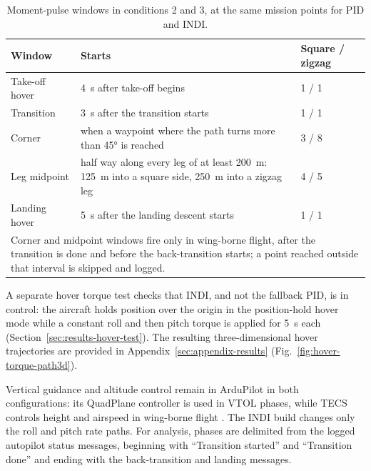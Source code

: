 \documentclass{article}
\begin{document}
\begin{table}[H]
\centering
\caption{Moment-pulse windows in conditions 2 and 3, at the same mission points for PID and INDI.}
\label{tab:disturbance-points}
\begin{tabular}{p{}p{}p{}}
\hline
Window & Starts & Square / zigzag \\
\hline
Take-off hover & \SI{4}{\second} after take-off begins & 1 / 1 \\
\hline
Transition & \SI{3}{\second} after the transition starts & 1 / 1 \\
\hline
Corner & when a waypoint where the path turns more than \ang{45} is reached & 3 / 8 \\
\hline
Leg midpoint & half way along every leg of at least \SI{200}{\meter}: \SI{125}{\meter} into a square side, \SI{250}{\meter} into a zigzag leg & 4 / 5 \\
\hline
Landing hover & \SI{5}{\second} after the landing descent starts & 1 / 1 \\
\hline
\multicolumn{3}{p{0.92\textwidth}}{Corner and midpoint windows fire only in wing-borne flight, after the transition is done and before the back-transition starts; a point reached outside that interval is skipped and logged.} \\
\hline
\end{tabular}
\end{table}

A separate hover torque test checks that INDI, and not the fallback PID, is in control: the aircraft holds position over the origin in the position-hold hover mode while a constant roll and then pitch torque is applied for \SI{5}{\second} each (Section~\ref{sec:results-hover-test}). The resulting three-dimensional hover trajectories are provided in Appendix~\ref{sec:appendix-results} (Fig.~\ref{fig:hover-torque-path3d}).

Vertical guidance and altitude control remain in ArduPilot in both configurations: its QuadPlane controller is used in VTOL phases, while TECS controls height and airspeed in wing-borne flight \citep{ardupilottransitions,ardupilottecs}. The INDI build changes only the roll and pitch rate paths. For analysis, phases are delimited from the logged autopilot status messages, beginning with ``Transition started'' and ``Transition done'' and ending with the back-transition and landing messages.
\end{document}
